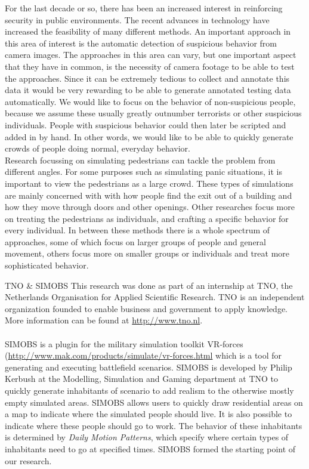 \documentclass[11pt, a4paper]{book}
\begin{document}
For the last decade or so, there has been an increased interest in reinforcing security in public environments. The recent advances in technology have increased the feasibility of many different methods. An important approach in this area of interest is the automatic detection of suspicious behavior from camera images. The approaches in this area can vary, but one important aspect that they have in common, is the necessity of camera footage to be able to test the approaches. Since it can be extremely tedious to collect and annotate this data it would be very rewarding to be able to generate annotated testing data automatically. We would like to focus on the behavior of non-suspicious people, because we assume these usually greatly outnumber terrorists or other suspicious individuals. People with suspicious behavior could then later be scripted and added in by hand. In other words, we would like to be able to quickly generate crowds of people doing normal, everyday behavior.\\

Research focussing on simulating pedestrians can tackle the problem from different angles. For some purposes such as simulating panic situations, it is important to view the pedestrians as a large crowd. These types of simulations are mainly concerned with with how people find the exit out of a building and how they move through doors and other openings. Other researches focus more on treating the pedestrians as individuals, and crafting a specific behavior for every individual. In between these methods there is a whole spectrum of approaches, some of which focus on larger groups of people and general movement, others focus more on smaller groups or individuals and treat more sophisticated behavior.\\
\begin{bclogo}[logo=\bctrombone]{TNO \& SIMOBS}
This research was done as part of an internship at TNO, the Netherlands Organisation for Applied Scientific Research.  TNO is an independent organization founded to enable business and government to apply knowledge. More information can be found at \url{http://www.tno.nl}.\\\\
SIMOBS is a plugin for the military simulation toolkit VR-forces (\url{http://www.mak.com/products/simulate/vr-forces.html} which is a tool for generating and executing battlefield scenarios. SIMOBS is developed by Philip Kerbush at the Modelling, Simulation and Gaming department at TNO to quickly generate inhabitants of scenario to add realism to the otherwise mostly empty simulated areas. SIMOBS allows users to quickly draw residential areas on a map to indicate where the simulated people should live. It is also possible to indicate where these people should go to work. The behavior of these inhabitants is determined by \emph{Daily Motion Patterns}, which specify where certain types of inhabitants need to go at specified times. SIMOBS formed the starting point of our research.
\end{bclogo}
\end{document}
